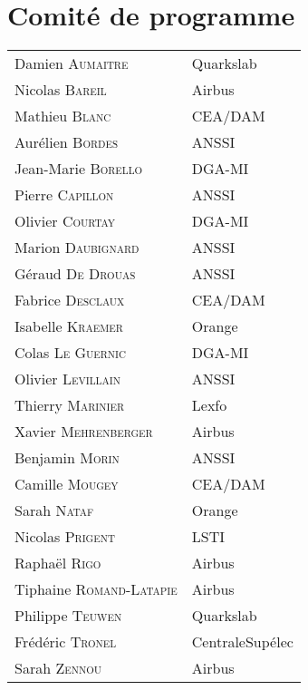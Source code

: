 \section*{Comité de programme}
\begin{tabular}{@{}p{5cm}@{}p{6.5cm}@{}}
  Damien \textsc{Aumaitre}        & Quarkslab           \\
  Nicolas  \textsc{Bareil}        & Airbus              \\
  Mathieu \textsc{Blanc}          & CEA/DAM             \\
  Aurélien \textsc{Bordes}        & ANSSI               \\
  Jean-Marie \textsc{Borello}     & DGA-MI              \\
  Pierre   \textsc{Capillon}      & ANSSI               \\
  Olivier \textsc{Courtay}        & DGA-MI              \\
  Marion \textsc{Daubignard}      & ANSSI               \\
  Géraud \textsc{De Drouas}       & ANSSI               \\
  Fabrice \textsc{Desclaux}       & CEA/DAM             \\
  Isabelle \textsc{Kraemer}       & Orange              \\
  Colas \textsc{Le Guernic}       & DGA-MI              \\
  Olivier \textsc{Levillain}      & ANSSI               \\
  Thierry \textsc{Marinier}       & Lexfo               \\
  Xavier \textsc{Mehrenberger}    & Airbus              \\
  Benjamin \textsc{Morin}         & ANSSI               \\
  Camille \textsc{Mougey}         & CEA/DAM             \\
  Sarah \textsc{Nataf}            & Orange              \\
  Nicolas \textsc{Prigent}        & LSTI                \\
  Raphaël \textsc{Rigo}           & Airbus              \\
  Tiphaine \textsc{Romand-Latapie} & Airbus             \\
  Philippe \textsc{Teuwen}        & Quarkslab           \\
  Frédéric \textsc{Tronel}        & CentraleSupélec     \\
  Sarah \textsc{Zennou}           & Airbus              \\
\end{tabular}


